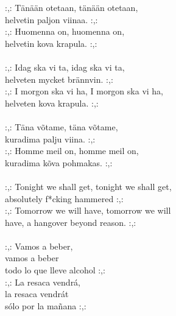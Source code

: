 
:,: Tänään otetaan, tänään otetaan, \\ helvetin paljon viinaa. :,: \\ :,: Huomenna on, huomenna on, \\ helvetin kova krapula. :,: \\ \hspace{10mm} \\ :,: Idag ska vi ta, idag ska vi ta, \\ helveten mycket brännvin. :,: \\ :,: I morgon ska vi ha, I morgon ska vi ha, \\ helveten kova krapula. :,: \\ \hspace{10mm} \\ :,: Täna võtame, täna võtame, \\ kuradima palju viina. :,: \\ :,: Homme meil on, homme meil on, \\ kuradima kõva pohmakas. :,: \\ \hspace{10mm} \\ :,: Tonight we shall get, tonight we shall get, \\ absolutely f*cking hammered :,: \\ :,: Tomorrow we will have, tomorrow we will \\ have, a hangover beyond reason. :,: \\ \hspace{10mm} \\ :,: Vamos a beber, \\ vamos a beber \\ todo lo que lleve alcohol :,: \\ :,: La resaca vendrá, \\ la resaca vendrát \\ sólo por la mañana :,: